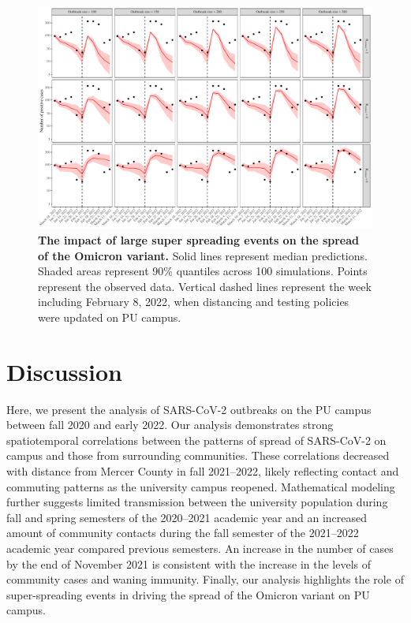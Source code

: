 \documentclass[12pt]{article}
\begin{document}
\begin{figure}[!thp]
\includegraphics[width=\textwidth]{../figure_princeton_new/figure_princeton_simulation_omicron_outbreak.pdf}
\caption{
\textbf{The impact of large super spreading events on the spread of the Omicron variant.}
Solid lines represent median predictions.
Shaded areas represent 90\% quantiles across 100 simulations.
Points represent the observed data.
Vertical dashed lines represent the week including February 8, 2022, when distancing and testing policies were updated on PU campus.
}
\label{fig:omicron2}
\end{figure}

\section*{Discussion}

Here, we present the analysis of SARS-CoV-2 outbreaks on the PU campus between fall 2020 and early 2022.
Our analysis demonstrates strong spatiotemporal correlations between the patterns of spread of SARS-CoV-2 on campus and those from surrounding communities.
These correlations decreased with distance from Mercer County in fall 2021--2022, likely reflecting contact and commuting patterns as the university campus reopened.
Mathematical modeling further suggests limited transmission between the university population during fall and spring semesters of the 2020--2021 academic year and an increased amount of community contacts during the fall semester of the 2021--2022 academic year compared previous semesters.
An increase in the number of cases by the end of November 2021 is consistent with the increase in the levels of community cases and waning immunity.
Finally, our analysis highlights the role of super-spreading events in driving the spread of the Omicron variant on PU campus.
\end{document}
